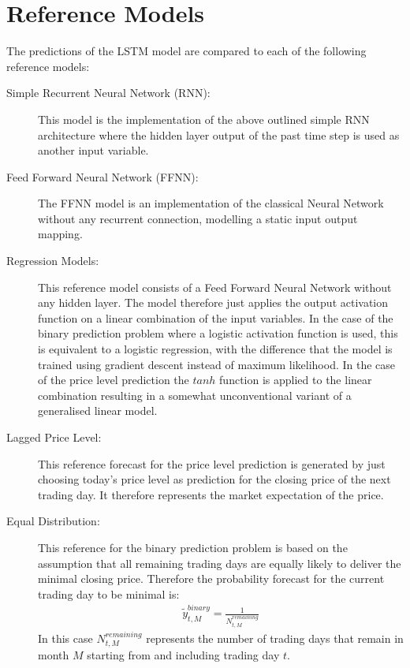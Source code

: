 \section{Reference Models}
The predictions of the LSTM model are compared to each of the following reference models:
\begin{description}
\item[Simple Recurrent Neural Network (RNN):] This model is the implementation of the above outlined simple RNN architecture where the hidden layer output of the past time step is used as another input variable.
\item[Feed Forward Neural Network (FFNN):] The FFNN model is an implementation of the classical Neural Network without any recurrent connection, modelling  a static input output mapping. 
\item[Regression Models:] This reference model consists of a Feed Forward Neural Network without any hidden layer. The model therefore just applies the output activation function on a linear combination of the input variables. In the case of the binary prediction problem  where a logistic activation function is used, this is equivalent to a logistic regression, with the difference that the model is trained using gradient descent instead of maximum likelihood. In the case of the price level prediction the $tanh$ function is applied to the linear combination resulting in a somewhat unconventional variant of a generalised linear model.
\item[Lagged Price Level:] This reference forecast for the price level prediction is generated by just choosing today's price level as prediction for the closing price of the next trading day. It therefore represents the market expectation of the price.
\item[Equal Distribution:] This reference for the binary prediction problem is based on the assumption that all remaining trading days are equally likely to deliver the minimal closing price. Therefore the probability forecast for the current trading day to be minimal is: \begin{align*}
\tilde{y}^{binary}_{t,M} = \frac{1}{N^{remaining}_{t,M}}
\end{align*}
In this case $N^{remaining}_{t,M}$ represents the number of trading days that remain in month $M$ starting from and including trading day $t$.
\end{description}


